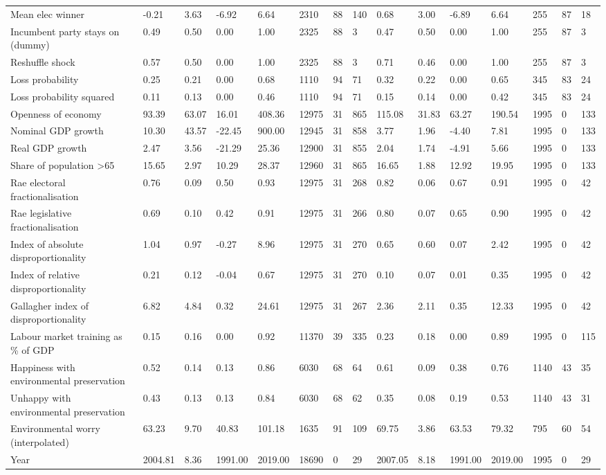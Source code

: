 \begin{longtable}{lllllllllllllll}
Mean elec winner & -0.21 & 3.63 & -6.92 & 6.64 & 2310 & 88 & 140 & 0.68 & 3.00 & -6.89 & 6.64 & 255 & 87 & 18\\
Incumbent party stays on (dummy) & 0.49 & 0.50 & 0.00 & 1.00 & 2325 & 88 & 3 & 0.47 & 0.50 & 0.00 & 1.00 & 255 & 87 & 3\\
\addlinespace
Reshuffle shock & 0.57 & 0.50 & 0.00 & 1.00 & 2325 & 88 & 3 & 0.71 & 0.46 & 0.00 & 1.00 & 255 & 87 & 3\\
Loss probability & 0.25 & 0.21 & 0.00 & 0.68 & 1110 & 94 & 71 & 0.32 & 0.22 & 0.00 & 0.65 & 345 & 83 & 24\\
Loss probability squared & 0.11 & 0.13 & 0.00 & 0.46 & 1110 & 94 & 71 & 0.15 & 0.14 & 0.00 & 0.42 & 345 & 83 & 24\\
Openness of economy & 93.39 & 63.07 & 16.01 & 408.36 & 12975 & 31 & 865 & 115.08 & 31.83 & 63.27 & 190.54 & 1995 & 0 & 133\\
Nominal GDP growth & 10.30 & 43.57 & -22.45 & 900.00 & 12945 & 31 & 858 & 3.77 & 1.96 & -4.40 & 7.81 & 1995 & 0 & 133\\
\addlinespace
Real GDP growth & 2.47 & 3.56 & -21.29 & 25.36 & 12900 & 31 & 855 & 2.04 & 1.74 & -4.91 & 5.66 & 1995 & 0 & 133\\
Share of population >65 & 15.65 & 2.97 & 10.29 & 28.37 & 12960 & 31 & 865 & 16.65 & 1.88 & 12.92 & 19.95 & 1995 & 0 & 133\\
Rae electoral fractionalisation & 0.76 & 0.09 & 0.50 & 0.93 & 12975 & 31 & 268 & 0.82 & 0.06 & 0.67 & 0.91 & 1995 & 0 & 42\\
Rae legislative fractionalisation & 0.69 & 0.10 & 0.42 & 0.91 & 12975 & 31 & 266 & 0.80 & 0.07 & 0.65 & 0.90 & 1995 & 0 & 42\\
Index of absolute disproportionality & 1.04 & 0.97 & -0.27 & 8.96 & 12975 & 31 & 270 & 0.65 & 0.60 & 0.07 & 2.42 & 1995 & 0 & 42\\
\addlinespace
Index of relative disproportionality & 0.21 & 0.12 & -0.04 & 0.67 & 12975 & 31 & 270 & 0.10 & 0.07 & 0.01 & 0.35 & 1995 & 0 & 42\\
Gallagher index of disproportionality & 6.82 & 4.84 & 0.32 & 24.61 & 12975 & 31 & 267 & 2.36 & 2.11 & 0.35 & 12.33 & 1995 & 0 & 42\\
Labour market training as \% of GDP & 0.15 & 0.16 & 0.00 & 0.92 & 11370 & 39 & 335 & 0.23 & 0.18 & 0.00 & 0.89 & 1995 & 0 & 115\\
Happiness with environmental preservation & 0.52 & 0.14 & 0.13 & 0.86 & 6030 & 68 & 64 & 0.61 & 0.09 & 0.38 & 0.76 & 1140 & 43 & 35\\
Unhappy with environmental preservation & 0.43 & 0.13 & 0.13 & 0.84 & 6030 & 68 & 62 & 0.35 & 0.08 & 0.19 & 0.53 & 1140 & 43 & 31\\
\addlinespace
Environmental worry (interpolated) & 63.23 & 9.70 & 40.83 & 101.18 & 1635 & 91 & 109 & 69.75 & 3.86 & 63.53 & 79.32 & 795 & 60 & 54\\
Year & 2004.81 & 8.36 & 1991.00 & 2019.00 & 18690 & 0 & 29 & 2007.05 & 8.18 & 1991.00 & 2019.00 & 1995 & 0 & 29\\
\bottomrule
\end{longtable}
